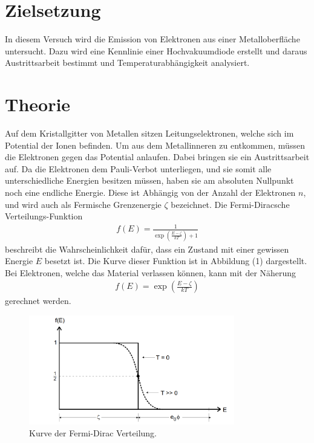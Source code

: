 \section{Zielsetzung}
\label{sec:Zielsetzung}
In diesem Versuch wird die Emission von Elektronen aus einer Metalloberfläche untersucht. Dazu wird eine Kennlinie einer Hochvakuumdiode erstellt und daraus Austrittsarbeit bestimmt und Temperaturabhängigkeit analysiert.


\section{Theorie}
\label{sec:Theorie}
Auf dem Kristallgitter von Metallen sitzen Leitungselektronen, welche sich im Potential der Ionen befinden. Um aus dem Metallinneren zu entkommen, müssen die Elektronen gegen das Potential anlaufen. Dabei bringen sie ein Austrittsarbeit auf.
Da die Elektronen dem Pauli-Verbot unterliegen, und sie somit alle unterschiedliche Energien besitzen müssen, haben sie am absoluten Nullpunkt noch eine endliche Energie. Diese ist Abhängig von der Anzahl der Elektronen $n$, und wird auch als Fermische Grenzenergie $\zeta$ bezeichnet.
Die Fermi-Diracsche Verteilungs-Funktion
\begin{align}
f(E) = \frac{1}{\exp(\frac{E-\zeta}{kT})+1}
\end{align}
beschreibt die Wahrscheinlichkeit dafür, dass ein Zustand mit einer gewissen Energie $E$ besetzt ist.
Die Kurve dieser Funktion ist in Abbildung (1) dargestellt.
Bei Elektronen, welche das Material verlassen können, kann mit der Näherung
\begin{align}
f(E) = \exp(\frac{E-\zeta}{kT})
\end{align}
gerechnet werden.
\begin{figure}[H]
  \centering
  \includegraphics[width=0.8\textwidth]{fermi.png}
  \caption{Kurve der Fermi-Dirac Verteilung\cite{kent}.}
  \label{fig:aufbau}
\end{figure}

